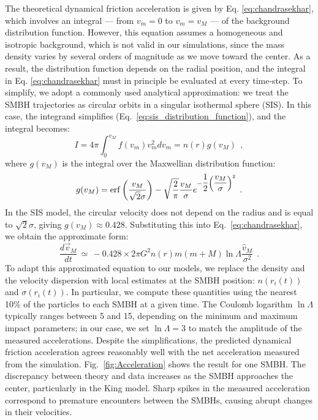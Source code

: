 \documentclass[fleqn,usenatbib]{mnras}
\begin{document}
The theoretical dynamical friction acceleration is given by Eq. \ref{eq:chandrasekhar}, which involves an integral — from $v_m=0$ to $v_m=v_M$ — of the background distribution function.
However, this equation assumes a homogeneous and isotropic background, which is not valid in our simulations, since the mass density varies by several orders of magnitude as we move toward the center.
As a result, the distribution function depends on the radial position, and the integral in Eq. \ref{eq:chandrasekhar} must in principle be evaluated at every time-step.
To simplify, we adopt a commonly used analytical approximation: we treat the SMBH trajectories as circular orbits in a singular isothermal sphere (SIS).
In this case, the integrand simplifies (Eq.~\ref{eq:sis_distribution_function}), and the integral becomes:
\begin{equation}
    I = 4 \pi \int_0^{v_M} f(v_m) v_m^2 dv_m = n(r) g(v_M) \:\:,
    \label{eq:chandrasekhar_sis_integral}
\end{equation}
where $g(v_M)$ is the integral over the Maxwellian distribution function:
\begin{equation}
    g(v_M) = \erf\left(\dfrac{v_M}{\sqrt{2} \sigma}\right) - \sqrt{\dfrac{2}{\pi}} \dfrac{v_M}{\sigma} e^{-\dfrac{1}{2} \left(\dfrac{v_M}{\sigma}\right)^2} \:\: .
    \label{eq:chandrasekhar_sis_g}
\end{equation}
In the SIS model, the circular velocity does not depend on the radius and is equal to $\sqrt{2} \sigma$, giving $g(v_M) \approx 0.428$.
Substituting this into Eq.~\ref{eq:chandrasekhar}, we obtain the approximate form:
\begin{equation}
    \dfrac{d\vec{v}_M}{dt} \, \simeq \, -0.428 \times 2 \pi G^2 n(r) m (m+M) \ln \Lambda \dfrac{\hat{v}_M}{\sigma^2} \:\: .
    \label{eq:chandrasekhar_sis}
\end{equation}
To adapt this approximated equation to our models, we replace the density and the velocity dispersion with local estimates at the SMBH position: $n(r_i(t))$ and $\sigma(r_i(t))$.
In particular, we compute these quantities using the nearest 10\% of the particles to each SMBH at a given time.
The Coulomb logarithm $\ln \Lambda$ typically ranges between 5 and 15, depending on the minimum and maximum impact parameters; in our case, we set $\ln \Lambda = 3$ to match the amplitude of the measured accelerations.
Despite the simplifications, the predicted dynamical friction acceleration agrees reasonably well with the net acceleration measured from the simulation. 
Fig.~\ref{fig:Acceleration} shows the result for one SMBH.
The discrepancy between theory and data increases as the SMBH approaches the center, particularly in the King model.
Sharp spikes in the measured acceleration correspond to premature encounters between the SMBHs, causing abrupt changes in their velocities.
\end{document}
